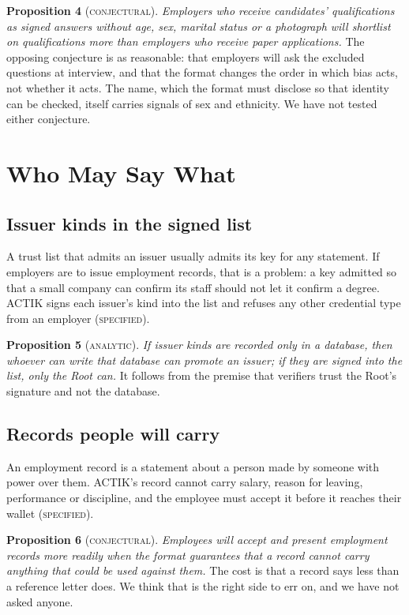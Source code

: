 \documentclass[10pt,a4paper,twocolumn]{article}
\newcommand{\kind}[1]{\textsc{#1}}
\begin{document}
\textbf{Proposition 4} (\kind{conjectural}). \emph{Employers who receive
candidates' qualifications as signed answers without age, sex, marital status or
a photograph will shortlist on qualifications more than employers who receive
paper applications.} The opposing conjecture is as reasonable: that employers
will ask the excluded questions at interview, and that the format changes the
order in which bias acts, not whether it acts. The name, which the format must
disclose so that identity can be checked, itself carries signals of sex and
ethnicity. We have not tested either conjecture.

\section{Who May Say What}
\label{sec:tiers}

\subsection{Issuer kinds in the signed list}

A trust list that admits an issuer usually admits its key for any statement. If
employers are to issue employment records, that is a problem: a key admitted so
that a small company can confirm its staff should not let it confirm a degree.
ACTIK signs each issuer's kind into the list and refuses any other credential
type from an employer (\kind{specified}).

\textbf{Proposition 5} (\kind{analytic}). \emph{If issuer kinds are recorded only
in a database, then whoever can write that database can promote an issuer; if
they are signed into the list, only the Root can.} It follows from the premise
that verifiers trust the Root's signature and not the database.

\subsection{Records people will carry}

An employment record is a statement about a person made by someone with power
over them. ACTIK's record cannot carry salary, reason for leaving, performance or
discipline, and the employee must accept it before it reaches their wallet
(\kind{specified}).

\textbf{Proposition 6} (\kind{conjectural}). \emph{Employees will accept and
present employment records more readily when the format guarantees that a record
cannot carry anything that could be used against them.} The cost is that a record
says less than a reference letter does. We think that is the right side to err
on, and we have not asked anyone.
\end{document}
